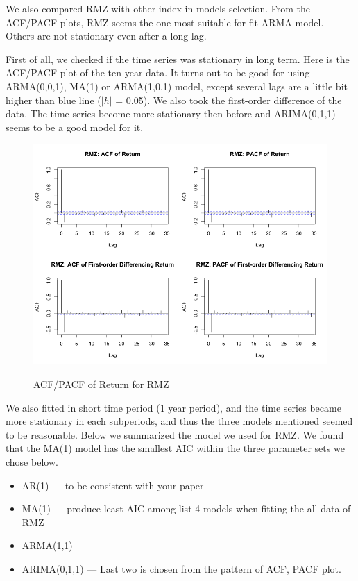 \documentclass[12pt]{article}
\begin{document}
We also compared RMZ with other index in models selection. From the ACF/PACF plots, RMZ seems the one most suitable for fit ARMA model. Others are not stationary even after a long lag.

First of all, we checked if the time series was stationary in long term. Here is the ACF/PACF plot of the ten-year data. It turns out to be good for using ARMA(0,0,1), MA(1) or ARMA(1,0,1) model, except several lags are a little bit higher than blue line ($|h|$ = 0.05). We also took the first-order difference of the data. The time series become more stationary then before and ARIMA(0,1,1) seems to be a good model for it.

\begin{figure}
  \caption{ACF/PACF of Return for RMZ}
  \includegraphics[width = 1\textwidth]{../results/ACFofRMZ}
  \label{fig:ACFofRMZ}
\end{figure}

We also fitted in short time period (1 year period), and the time series became more stationary in each subperiods, and thus the three models mentioned seemed to be reasonable. Below we summarized the model we used for RMZ. We found that the MA(1) model has the smallest AIC within the three parameter sets we chose below. 
\begin{itemize}
\item AR(1) --- to be consistent with your paper
\item MA(1) --- produce least AIC among list 4 models when fitting the all data of RMZ
\item ARMA(1,1)
\item ARIMA(0,1,1) --- Last two is chosen from the pattern of ACF, PACF plot.
\end{itemize}
\end{document}
